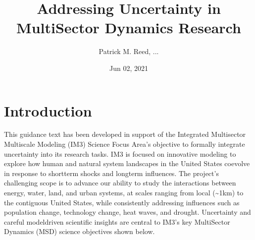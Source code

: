 \documentclass[letterpaper,10pt,english]{sphinxmanual}
\title{Addressing Uncertainty in MultiSector Dynamics Research}
\date{Jun 02, 2021}
\author{Patrick M.\@{} Reed, ...\@{}}
\begin{document}
\pagestyle{empty}
\sphinxmaketitle
\pagestyle{plain}
\sphinxtableofcontents
\pagestyle{normal}
\label{\detokenize{index::doc}}



\chapter{Introduction}
\label{\detokenize{1_introduction:introduction}}\label{\detokenize{1_introduction::doc}}
\sphinxAtStartPar
This guidance text has been developed in support of the Integrated Multisector Multiscale Modeling (IM3) Science Focus Area’s objective to formally integrate uncertainty into its research tasks. IM3 is focused on innovative modeling to explore how human and natural system landscapes in the United States co\sphinxhyphen{}evolve in response to short\sphinxhyphen{}term shocks and long\sphinxhyphen{}term influences. The project’s challenging scope is to advance our ability to study the interactions between energy, water, land, and urban systems, at scales ranging from local (\textasciitilde{}1km) to the contiguous United States, while consistently addressing influences such as population change, technology change, heat waves, and drought. Uncertainty and careful model\sphinxhyphen{}driven scientific insights are central to IM3’s key MultiSector Dynamics (MSD) science objectives shown below.

\sphinxAtStartPar
{}

\sphinxAtStartPar
{}

\sphinxAtStartPar
{}

\sphinxAtStartPar
{}
\end{document}
